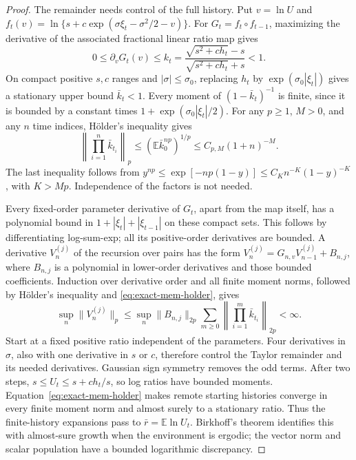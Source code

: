 \begin{proof}
The remainder needs control of the full history. Put $v=\ln U$ and
$f_t(v)=\ln\{s+c\exp(\sigma\xi_t-\sigma^2/2-v)\}$.
For $G_t=f_t\circ f_{t-1}$, maximizing the derivative of the associated
fractional linear ratio map gives
\begin{equation}
 0\leq\partial_vG_t(v)\leq
 k_t=\frac{\sqrt{s^2+c h_t}-s}{\sqrt{s^2+c h_t}+s}<1.
 \label{eq:exact-mem-contraction}
\end{equation}
On compact positive $s,c$ ranges and $|\sigma|\leq\sigma_0$, replacing
$h_t$ by $\exp(\sigma_0|\xi_t|)$ gives a stationary upper bound
$\bar k_t<1$. Every moment of $(1-\bar k_t)^{-1}$ is finite, since it
is bounded by a constant times $1+\exp(\sigma_0|\xi_t|/2)$.
For any $p\geq1$, $M>0$, and any $n$ time indices, H\"older's inequality gives
\begin{equation}
 \left\|\prod_{i=1}^n\bar k_{t_i}\right\|_p
 \leq(\mathbb E\bar k_0^{np})^{1/p}
 \leq C_{p,M}(1+n)^{-M}.
 \label{eq:exact-mem-holder}
\end{equation}
The last inequality follows from
$y^{np}\leq\exp[-np(1-y)]\leq C_K n^{-K}(1-y)^{-K}$,
with $K>Mp$. Independence of the factors is not needed.

Every fixed-order parameter derivative of $G_t$, apart from the map
itself, has a polynomial bound in $1+|\xi_t|+|\xi_{t-1}|$ on these
compact sets. This follows by differentiating log-sum-exp; all its
positive-order derivatives are bounded. A derivative $V_n^{(j)}$ of
the recursion over pairs has the form
$V_n^{(j)}=G_{n,v}V_{n-1}^{(j)}+B_{n,j}$, where $B_{n,j}$ is a
polynomial in lower-order derivatives and those bounded coefficients.
Induction over derivative order and all finite moment norms, followed
by H\"older's inequality and \eqref{eq:exact-mem-holder}, gives
\begin{equation}
 \sup_n\|V_n^{(j)}\|_p
 \leq\sup_n\|B_{n,j}\|_{2p}
 \sum_{m\geq0}\left\|\prod_{i=1}^m\bar k_{t_i}\right\|_{2p}<\infty.
 \label{eq:exact-mem-derivatives}
\end{equation}
Start at a fixed positive ratio independent of the parameters.
Four derivatives in $\sigma$, also with one derivative in $s$ or $c$,
therefore control the Taylor remainder and its needed derivatives.
Gaussian sign symmetry removes the odd terms. After two steps,
$s\leq U_t\leq s+c h_t/s$, so log ratios have bounded moments.
Equation~\eqref{eq:exact-mem-holder} makes remote starting histories
converge in every finite moment norm and almost surely to a stationary
ratio. Thus the finite-history expansions pass to
$\bar r=\mathbb E\ln U_t$. Birkhoff's theorem identifies this with
almost-sure growth when the environment is ergodic; the vector norm
and scalar population have a bounded logarithmic discrepancy.


\end{proof}
